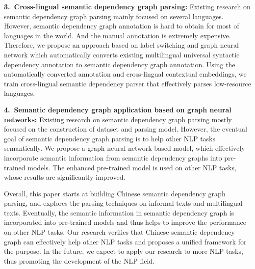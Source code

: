 \begin{eabstract}
\textbf{3.\ Cross-lingual semantic dependency graph parsing:} 
Existing research on semantic dependency graph parsing mainly focused on several languages. 
However, semantic dependency graph annotation is hard to obtain for most of languages in the world. 
And the manual annotation is extremely expensive. 
Therefore, we propose an approach based on label switching and graph neural network which automatically converts existing multilingual universal syntactic dependency annotation to semantic dependency graph annotation. 
Using the automatically converted annotation and cross-lingual contextual embeddings, we train cross-lingual semantic dependency parser that effectively parses low-resource languages. 

\textbf{4.\ Semantic dependency graph application based on graph neural networks:} 
Existing research on semantic dependency graph parsing mostly focused on the construction of dataset and parsing model. 
However, the eventual goal of semantic dependency graph parsing is to help other NLP tasks semantically. 
We propose a graph neural network-based model, which effectively incorporate semantic information from semantic dependency graphs into pre-trained models. 
The enhanced pre-trained model is used on other NLP tasks, whose results are significantly improved. 

Overall, this paper starts at building Chinese semantic dependency graph parsing, and explores the parsing techniques on informal texts and multilingual texts. 
Eventually, the semantic information in semantic dependency graph is incorporated into pre-trained models and thus helps to improve the performance on other NLP tasks. 
Our research verifies that Chinese semantic dependency graph can effectively help other NLP tasks and proposes a unified framework for the purpose. 
In the future, we expect to apply our research to more NLP tasks, thus promoting the development of the NLP field. 


\end{eabstract}
